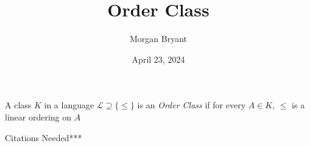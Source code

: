 \documentclass[a4paper]{article}
\title{Order Class}
\date{April 23, 2024}
\author{Morgan Bryant}
\begin{document}
\maketitle
\par{A class \(K\) in a language \(\mathcal {L}  \supseteq   \{ \leq \}\) is an \emph{Order Class} if for every \(A \in  K\), \(\leq\) is a linear ordering on \(A\)}\par{Citations Needed***}
\printbibliography
\end{document}
